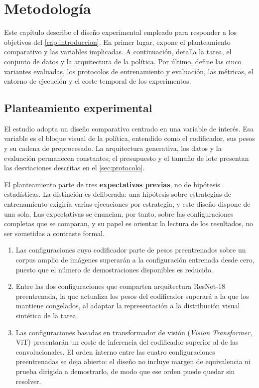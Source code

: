 \chapter{Metodolog\'ia}
\label{cap:metodologia}

Este cap\'itulo describe el dise\~no experimental empleado para responder a los objetivos
del \cref{cap:introduccion}. En primer lugar, expone el planteamiento comparativo y las
variables implicadas. A continuaci\'on, detalla la tarea, el conjunto de datos y la
arquitectura de la pol\'itica. Por \'ultimo, define las cinco variantes evaluadas, los
protocolos de entrenamiento y evaluaci\'on, las m\'etricas, el entorno de ejecuci\'on y el
coste temporal de los experimentos.

\section{Planteamiento experimental}
\label{sec:planteamiento}

El estudio adopta un dise\~no comparativo centrado en una variable de inter\'es. Esa variable
es el bloque visual de la pol\'itica, entendido como el codificador, sus pesos y su cadena de
preprocesado. La arquitectura generativa, los datos y la evaluaci\'on permanecen constantes;
el presupuesto y el tama\~no de lote presentan las desviaciones descritas en el
\cref{sec:protocolo}.

El planteamiento parte de tres \textbf{expectativas previas}, no de hip\'otesis
estad\'isticas. La distinci\'on es deliberada: una hip\'otesis sobre estrategias de
entrenamiento exigir\'ia varias ejecuciones por estrategia, y este dise\~no dispone de una
sola. Las expectativas se enuncian, por tanto, sobre las configuraciones completas que se
comparan, y su papel es orientar la lectura de los resultados, no ser sometidas a
contraste formal.

\begin{enumerate}[label=E\arabic*.,leftmargin=*]
  \item Las configuraciones cuyo codificador parte de pesos preentrenados sobre un corpus
        amplio de im\'agenes superar\'an a la configuraci\'on entrenada desde cero, puesto
        que el n\'umero de demostraciones disponibles es reducido.
  \item Entre las dos configuraciones que comparten arquitectura ResNet-18 preentrenada,
        la que actualiza los pesos del codificador superar\'a a la que los mantiene
        congelados, al adaptar la representaci\'on a la distribuci\'on visual sint\'etica
        de la tarea.
  \item Las configuraciones basadas en transformador de visi\'on (\textit{Vision
        Transformer}, ViT) presentar\'an un coste de inferencia del codificador superior
        al de las convolucionales. El orden interno entre las cuatro configuraciones
        preentrenadas se deja abierto: el dise\~no no incluye margen de equivalencia ni
        prueba dirigida a demostrarlo, de modo que ese orden puede quedar sin resolver.
\end{enumerate}

